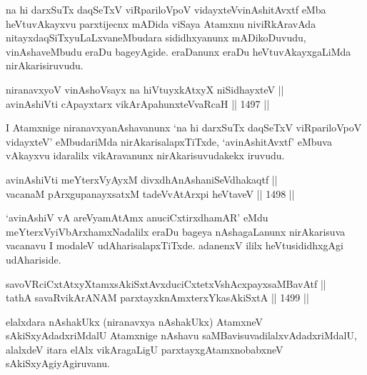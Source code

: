 \begin{artha}
na hi darxSuTx daqSeTxV viRpariloVpoV vidayxteV\s vinAshitAvxtf eMba heVtuvAkayxvu parxtijecnx mADida viSaya Atamxnu niviRkAravAda nitayxdaqSiTxyuLaLxvaneMbudara sididhxyanunx mADikoDuvudu, vinAshaveMbudu eraDu bageyAgide. eraDanunx eraDu heVtuvAkayxgaLiMda nirAkarisiruvudu.
\end{artha}


\begin{shl}
niranavxyoV vinAshoV\s sayx na hiVtuyxkAtxyX niSidhayxteV || \\
avinAshiVti cApayxtarx vikArApahunxteVvaRcaH ||  1497 ||  
\end{shl}

\begin{artha}
I Atamxnige niranavxyanAshavanunx `na hi darxSuTx daqSeTxV viRpariloVpoV vidayxteV' eMbudariMda nirAkarisalapxTiTxde, `avinAshitAvxtf' eMbuva vAkayxvu idaralilx vikAravanunx nirAkarisuvudakekx iruvudu.
\end{artha}


\begin{shl}
avinAshiVti meYterxVyAyxM divxdhAnAshaniSeVdhakaqtf || \\
vacanaM pArxgupanayxsatxM tadeVvAtArxpi heVtaveV ||  1498 ||  
\end{shl}

\begin{artha}
`avinAshiV vA areV\s yamAtAmx anuciCxtirxdhamAR' eMdu meYterxVyiVbArxhamxNadalilx eraDu bageya nAshagaLanunx nirAkarisuva vacanavu I modaleV udAharisalapxTiTxde. adanenxV ililx heVtusididhxgAgi udAhariside.
\end{artha}


\begin{shl}
savoVRciCxtAtxyXtamxsAkiSxtAvxduciCxtetxVshAcxpayxsaMBavAtf ||  \\
tathA savaRvikArANAM parxtayxknAmxterxYkasAkiSxtA ||  1499 ||  
\end{shl}

\begin{artha}
elalxdara nAshakUkx (niranavxya nAshakUkx) AtamxneV sAkiSxyAdadxriMdalU Atamxnige nAshavu saMBavisuvadilalxvAdadxriMdalU, alalxdeV itara elAlx vikAragaLigU parxtayxgAtamxnobabxneV sAkiSxyAgiyAgiruvanu.
\end{artha}

